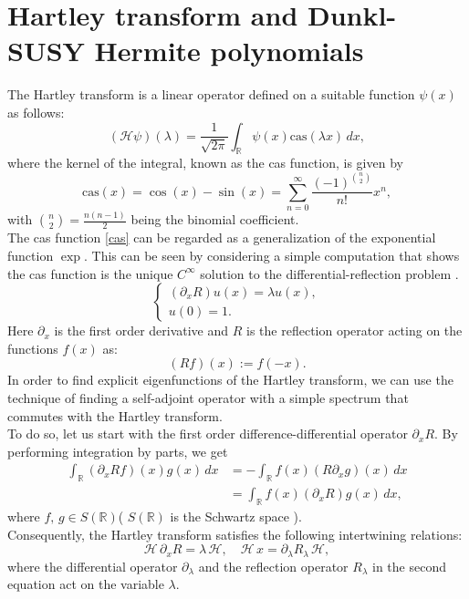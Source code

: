 \documentclass[12 pt]{amsart}
\numberwithin{equation}{section}
\begin{document}
\section{Hartley transform and Dunkl-SUSY Hermite polynomials }
The Hartley transform is a linear operator defined on a suitable function $\psi(x)$ as follows:
$$(\mathscr{H}\psi)(\lambda)=\frac{1}{\sqrt{2\pi}}\int_{\mathbb{R}} \psi(x)\text{cas}(\lambda x)\,dx,$$
where the kernel of the integral, known as the cas function, is given by
\begin{equation}\text{cas}(x)=\cos(x)-\sin(x)=\sum_{n=0}^\infty \frac{(-1)^{\binom{n}{2}}}{n!}x^n,\label{cas}
\end{equation}
with $\binom{n}{2}=\frac{n(n-1)}{2}$ being the binomial coefficient.\\ The cas function \eqref{cas} can be regarded as a generalization of the exponential function $\exp$. This can be seen by considering a simple computation that shows the cas function is the unique $C^\infty$ solution to the differential-reflection problem \cite{Bouz}.
\begin{equation}
\begin{cases}
(\partial_x R)u(x) = \lambda u(x), \\
u(0) = 1.
\end{cases}
\label{probHartley}
\end{equation}
Here $\partial_x$ is the first order derivative  and $R$ is the reflection operator acting on the functions $f(x)$  as: $$(Rf)(x):=f(-x).$$
In order to find explicit eigenfunctions of the Hartley transform, we can use the technique of finding a self-adjoint operator with a simple spectrum  that commutes with the Hartley transform.\\ To do so, let us start with the first order difference-differential operator $\partial_xR$.
 By performing integration by parts, we get
\begin{align*}
\int_{\mathbb{R}} (\partial_x Rf)(x) g(x)\,dx&= -\int_{\mathbb{R}} f(x) (R\partial_x   g)(x)\,dx\\&=
 \int_{\mathbb{R}} f(x) (\partial_xR)  g(x)\,dx,
\end{align*}
where   $f,\,g\in S(\mathbb{R})$( $S(\mathbb{R})$ is the Schwartz space ).\\
Consequently, the Hartley transform satisfies the following intertwining relations:
\begin{equation}
  \mathscr{H} \, \partial_x R = \lambda \, \mathscr{H}, \quad \mathscr{H} \, x = \partial_\lambda R_\lambda \, \mathscr{H},
\label{Interr}
\end{equation}
where the differential operator \(\partial_\lambda\) and the reflection operator \(R_\lambda\) in the second equation act on the variable \(\lambda\).
\end{document}
